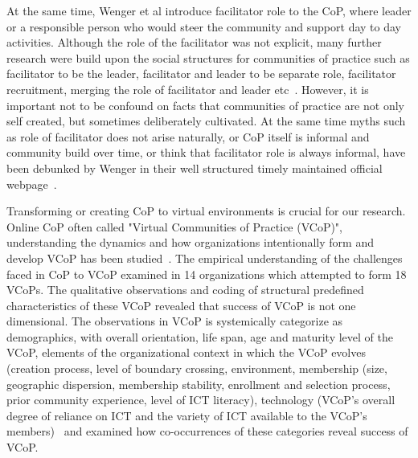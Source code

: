 \documentclass[format=acmsmall, review=false, screen=true]{acmart}
\begin{document}
At the same time, Wenger et al introduce facilitator role to the CoP, where leader or a responsible person who would steer the community and support day to day activities. Although the role of the facilitator was not explicit, many further research were build upon the social structures for communities of practice such as facilitator to be the leader, facilitator and leader to be separate role, facilitator recruitment, merging the role of facilitator and leader etc~\cite{tarmizi2005facilitation}. However, it is important not to be confound on facts that communities of practice are not only self created, but sometimes deliberately cultivated. At the same time myths such as role of facilitator does not arise naturally, or CoP itself is informal and community build over time, or think that facilitator role is always informal, have been debunked by Wenger in their well structured timely maintained official webpage~\cite{Wenger@site}. 


Transforming or creating CoP to virtual environments is crucial for our research. Online CoP often called "Virtual Communities of Practice (VCoP)", understanding the dynamics and how organizations
intentionally form and develop VCoP has been studied~\cite{dube2005impact}. The empirical understanding of the challenges faced in CoP to VCoP examined in 14 organizations which attempted to form 18 VCoPs. The qualitative observations and coding of structural predefined characteristics of these VCoP revealed that success of VCoP is not one dimensional. The observations in VCoP is systemically categorize as demographics,
with overall orientation, life span, age and maturity level of the VCoP, elements of the organizational context in which the VCoP evolves (creation process, level of boundary crossing, environment, membership (size, geographic dispersion, membership stability,
enrollment and selection process, prior community experience, level of ICT literacy), technology (VCoP’s overall degree of reliance on ICT and the variety of ICT available to the VCoP’s members)~\cite{dube2003towards} and examined how co-occurrences of these categories reveal success of VCoP. 
\end{document}

